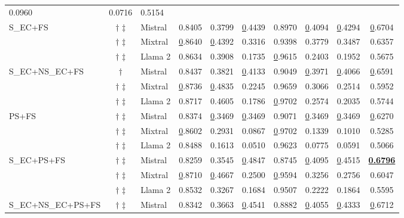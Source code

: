 \begin{table*}[!h]
\begin{tabular}{@{}lclccccccc@{}}
  0.0960 &
  0.0716 &
  0.5154 \\ \cmidrule(l){3-10}
\multirow{3}{*}{S\_EC+FS} &
  $\dagger$ $\ddagger$ &
  Mistral &
  0.8405 &
  0.3799 &
  {\ul 0.4439} &
  0.8970 &
  {\ul 0.4094} &
  {\ul 0.4294} &
  {\ul 0.6704} \\
 &
  $\dagger$ $\ddagger$ &
  Mixtral &
  {\ul 0.8640} &
  {\ul 0.4392} &
  0.3316 &
  0.9398 &
  0.3779 &
  0.3487 &
  0.6357 \\
 &
  $\dagger$ $\ddagger$ &
  Llama 2 &
  0.8634 &
  0.3908 &
  0.1735 &
  {\ul 0.9615} &
  0.2403 &
  0.1952 &
  0.5675 \\ \cmidrule(l){3-10}
\multirow{3}{*}{S\_EC+NS\_EC+FS} &
  $\dagger$ \hspace{0.46em} &
  Mistral &
  0.8437 &
  0.3821 &
  {\ul 0.4133} &
  0.9049 &
  {\ul 0.3971} &
  {\ul 0.4066} &
  {\ul 0.6591} \\
 &
  $\dagger$ $\ddagger$ &
  Mixtral &
  {\ul 0.8736} &
  {\ul 0.4835} &
  0.2245 &
  0.9659 &
  0.3066 &
  0.2514 &
  0.5952 \\
 &
  $\dagger$ $\ddagger$ &
  Llama 2 &
  0.8717 &
  0.4605 &
  0.1786 &
  {\ul 0.9702} &
  0.2574 &
  0.2035 &
  0.5744 \\ \cmidrule(l){3-10}
\multirow{3}{*}{PS+FS} &
  $\dagger$ $\ddagger$ &
  Mistral &
  0.8374 &
  {\ul 0.3469} &
  {\ul 0.3469} &
  0.9071 &
  {\ul 0.3469} &
  {\ul 0.3469} &
  {\ul 0.6270} \\
 &
  $\dagger$ $\ddagger$ &
  Mixtral &
  {\ul 0.8602} &
  0.2931 &
  0.0867 &
  {\ul 0.9702} &
  0.1339 &
  0.1010 &
  0.5285 \\
 &
  $\dagger$ $\ddagger$ &
  Llama 2 &
  0.8488 &
  0.1613 &
  0.0510 &
  0.9623 &
  0.0775 &
  0.0591 &
  0.5066 \\ \cmidrule(l){3-10}
\multirow{3}{*}{S\_EC+PS+FS} &
  $\dagger$ $\ddagger$ &
  Mistral &
  0.8259 &
  0.3545 &
  {\ul 0.4847} &
  0.8745 &
  {\ul 0.4095} &
  {\ul 0.4515} &
  {\ul \textbf{0.6796}} \\
 &
  $\dagger$ $\ddagger$ &
  Mixtral &
  {\ul 0.8710} &
  {\ul 0.4667} &
  0.2500 &
  {\ul 0.9594} &
  0.3256 &
  0.2756 &
  0.6047 \\
 &
  $\dagger$ $\ddagger$ &
  Llama 2 &
  0.8532 &
  0.3267 &
  0.1684 &
  0.9507 &
  0.2222 &
  0.1864 &
  0.5595 \\ \cmidrule(l){3-10}
\multirow{3}{*}{S\_EC+NS\_EC+PS+FS} &
  $\dagger$ $\ddagger$ &
  Mistral &
  0.8342 &
  0.3663 &
  {\ul 0.4541} &
  0.8882 &
  {\ul 0.4055} &
  {\ul 0.4333} &
  {\ul 0.6712} \\

\end{tabular}
\end{table*}
